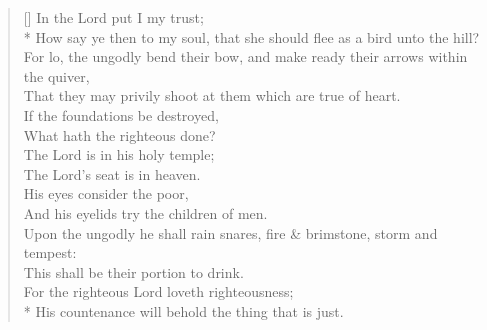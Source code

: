 \documentclass[MAIN]{subfiles}
\begin{document}
\settowidth{\versewidth}{\vin How say ye then to my soul, that she should flee as a bird unto the hill?}
\begin{verse}[\versewidth]
In the Lord put I my trust;\\*
\vin How say ye then to my soul, that she should flee as a bird unto the hill?\\
For lo, the ungodly bend their bow, and make ready their arrows within the quiver,\\
\vin That they may privily shoot at them which are true of heart.\\
If the foundations be destroyed,\\
\vin What hath the righteous done?\\
The Lord is in his holy temple;\\
\vin The Lord's seat is in heaven.\\
His eyes consider the poor,\\
\vin And his eyelids try the children of men.\\
Upon the ungodly he shall rain snares, fire \& brimstone, storm and tempest:\\
\vin This shall be their portion to drink.\\
For the righteous Lord loveth righteousness;\\*
\vin His countenance will behold the thing that is just.
\end{verse}
\end{document}
